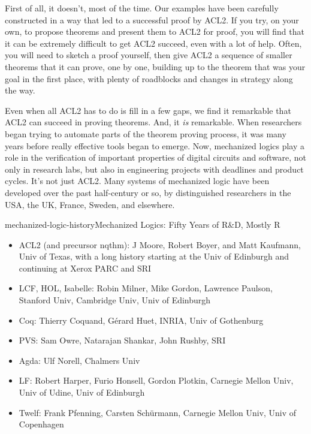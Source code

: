 First of all, it doesn't, most of the time.
Our examples have been carefully constructed in a way that
led to a successful proof by ACL2.
If you try, on your own, to propose theorems
and present them to ACL2 for proof, you will find that it can be
extremely difficult to get ACL2 succeed, even with a lot of help.
Often, you will need to sketch a proof yourself,
then give ACL2 a sequence of smaller theorems
that it can prove, one by one, building up to
the theorem that was your goal in the first place,
with plenty of roadblocks and changes in strategy along the way.

Even when all ACL2 has to do is fill in a few gaps,
we find it remarkable that ACL2 can succeed in proving theorems.
And, it \emph{is} remarkable.
When researchers began trying to automate parts
of the theorem proving process, it was many years
before really effective tools began to emerge.
Now, mechanized logics play a role in
the verification of important properties of digital circuits and
software, not only in research labs,
but also in engineering projects with deadlines and product cycles.
It's not just ACL2. Many systems of mechanized logic %
have been developed over the past half-century or so,
by distinguished researchers in the USA, the UK, France, Sweden, and elsewhere.

\begin{aside}{mechanized-logic-history}{Mechanized Logics: Fifty Years of R\&D, Mostly R}
\begin{itemize}
\item ACL2 (and precursor nqthm): J Moore, Robert Boyer, and Matt Kaufmann, Univ of Texas, with a long history starting at the Univ of Edinburgh and continuing at Xerox PARC and SRI
\item LCF, HOL, Isabelle: Robin Milner, Mike Gordon, Lawrence Paulson, Stanford Univ, Cambridge Univ, Univ of Edinburgh
\item Coq: Thierry Coquand, G\'erard Huet, INRIA, Univ of Gothenburg
\item PVS: Sam Owre, Natarajan Shankar, John Rushby, SRI
\item Agda: Ulf Norell, Chalmers Univ
\item LF: Robert Harper, Furio Honsell, Gordon Plotkin, Carnegie Mellon Univ, Univ of Udine, Univ of Edinburgh
\item Twelf: Frank Pfenning, Carsten Sch\"urmann, Carnegie Mellon Univ, Univ of Copenhagen
\end{itemize}
\end{aside}

